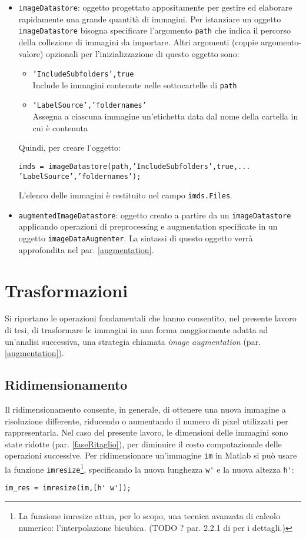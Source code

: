 \begin{itemize}

\item \verb|imageDatastore|: oggetto progettato appositamente per gestire ed elaborare rapidamente una grande quantità di immagini. Per istanziare un oggetto \verb|imageDatastore| bisogna specificare l'argomento \verb|path| che indica il percorso della collezione di immagini da importare. Altri argomenti (coppie argomento-valore) opzionali per l'inizializzazione di questo oggetto sono:
\begin{itemize}
\item \verb|’IncludeSubfolders’,true|\\
Include le immagini contenute nelle sottocartelle di \verb|path| 
\item \verb|’LabelSource’,’foldernames’|\\
Assegna a ciascuna immagine un’etichetta
data dal nome della cartella in cui è contenuta
\end{itemize}
Quindi, per creare l'oggetto:
\begin{verbatim}
imds = imageDatastore(path,’IncludeSubfolders’,true,...
’LabelSource’,’foldernames’);
\end{verbatim}
L’elenco delle immagini è restituito nel campo \verb|imds.Files|.

\item \verb|augmentedImageDatastore|: oggetto creato a partire da un \verb|imageDatastore| applicando operazioni di preprocessing e augmentation specificate in un oggetto \verb|imageDataAugmenter|. La sintassi di questo oggetto verrà approfondita nel par. \ref{augmentation}.

\end{itemize}

\section{Trasformazioni}
\label{trasformazioni}
Si riportano le operazioni fondamentali che hanno consentito, nel presente lavoro di tesi, di trasformare le immagini in una forma maggiormente adatta ad un’analisi successiva, una strategia chiamata \textit{image augmentation} (par. \ref{augmentation}).

\subsection{Ridimensionamento}
Il ridimensionamento consente, in generale, di ottenere una nuova immagine a risoluzione differente, riducendo o aumentando il numero di pixel utilizzati per rappresentarla.
Nel caso del presente lavoro, le dimensioni delle immagini sono state ridotte (par. \ref{faseRitaglio}), per diminuire il costo computazionale delle operazioni successive.
Per ridimensionare un'immagine \verb|im| in Matlab si può usare la funzione \verb|imresize|\footnote{La funzione imresize attua, per lo scopo, una tecnica avanzata di calcolo numerico: l’interpolazione bicubica. (TODO ? par. 2.2.1 di \cite{gianvito} per i dettagli.)}, specificando la nuova lunghezza \verb|w'| e la nuova altezza \verb|h'|:
\begin{verbatim}
im_res = imresize(im,[h' w']);
\end{verbatim}

